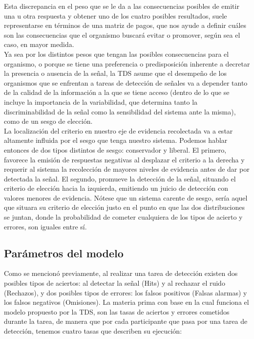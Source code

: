 \begin{itemize}
\begin{itemize}
Esta discrepancia en el peso que se le da a las consecuencias posibles de emitir una u otra respuesta y obtener uno de los cuatro posibles resultados, suele representarse en términos de una matriz de pagos, que nos ayude a definir cuáles son las consecuencias que el organismo buscará evitar o promover, según sea el caso, en mayor medida.\\

Ya sea por los distintos pesos que tengan las posibles consecuencias para el organismo, o porque se tiene una preferencia o predisposición inherente a decretar la presencia o ausencia de la señal, la TDS asume que el desempeño de los organismos que se enfrentan a tareas de detección de señales va a depender tanto de la calidad de la información a la que se tiene acceso (dentro de lo que se incluye la importancia de la variabilidad, que determina tanto la discriminabilidad de la señal como la sensibilidad del sistema ante la misma), como de un sesgo de elección.\\

La localización del criterio en nuestro eje de evidencia recolectada va a estar altamente influida por el sesgo que tenga nuestro sistema. Podemos hablar entonces de dos tipos distintos de sesgo: conservador y liberal. El primero, favorece la emisión de respuestas negativas al desplazar el criterio a la derecha y requerir al sistema la recolección de mayores niveles de evidencia antes de dar por detectada la señal. El segundo, promueve la detección de la señal, situando el criterio de elección hacia la izquierda, emitiendo un juicio de detección con valores menores de evidencia. Nótese que un sistema carente de sesgo, sería aquel que situara su criterio de elección justo en el punto en que las dos distribuciones se juntan, donde la probabilidad de cometer cualquiera de los tipos de acierto y errores, son iguales entre sí.\\

     \end{itemize}
\end{itemize}

\subsection{Parámetros del modelo}

Como se mencionó previamente, al realizar una tarea de detección existen dos posibles tipos de aciertos: al detectar la señal (Hits) y al rechazar el ruido (Rechazos), y dos posibles tipos de errores: los falsos positivos (Falsas alarmas) y los falsos negativos (Omisiones). La materia prima con base en la cual funciona el modelo propuesto por la TDS, son las tasas de aciertos y errores cometidos durante la tarea, de manera que por cada participante que pasa por una tarea de detección, tenemos cuatro tasas que describen su ejecución:

